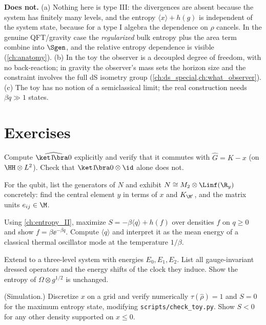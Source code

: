 \textbf{Does not.}
(a) Nothing here is type III: the divergences are absent because the system has finitely many levels, and the entropy $\langle x\rangle+h(g)$ is independent of the system state, because for a type I algebra the dependence on $\rho$ cancels. In the genuine QFT/gravity case the \emph{regularized} bulk entropy plus the area term combine into $\Sgen$, and the relative entropy dependence is visible (\cref{ch:anatomy}). (b) In the toy the observer is a decoupled degree of freedom, with no back-reaction; in gravity the observer's mass sets the horizon size and the constraint involves the full dS isometry group (\cref{ch:ds_special,ch:what_observer}). (c) The toy has no notion of a semiclassical limit; the real construction needs $\beta q\gg1$ states.

\section*{Exercises}
\begin{exercise}
Compute $\widehat{\ket1\!\bra0}$ explicitly and verify that it commutes with $\hat G=K-x$ (on $\HH\otimes L^2$). Check that $\ket1\!\bra0\otimes\id$ alone does not.
\end{exercise}
\begin{exercise}
For the qubit, list the generators of $N$ and exhibit $N\cong M_2\otimes\Linf(\R_y)$ concretely: find the central element $y$ in terms of $x$ and $K_{\M'}$, and the matrix units $e_{ij}\in\M$.
\end{exercise}
\begin{exercise}
Using \cref{ch:entropy_II}, maximize $S=-\beta\langle q\rangle+h(f)$ over densities $f$ on $q\ge0$ and show $f=\beta\ee^{-\beta q}$. Compute $\langle q\rangle$ and interpret it as the mean energy of a classical thermal oscillator mode at the temperature $1/\beta$.
\end{exercise}
\begin{exercise}
Extend to a three-level system with energies $E_0,E_1,E_2$. List all gauge-invariant dressed operators and the energy shifts of the clock they induce. Show the entropy of $\Omega\otimes g^{1/2}$ is unchanged.
\end{exercise}
\begin{exercise}
(Simulation.) Discretize $x$ on a grid and verify numerically $\tau(\hat\rho)=1$ and $S=0$ for the maximum entropy state, modifying \texttt{scripts/check\_toy.py}. Show $S<0$ for any other density supported on $x\le0$.
\end{exercise}
